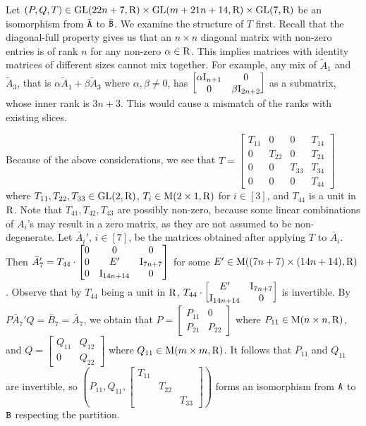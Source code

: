 \begin{example}
Let $(P, Q, T)\in \mathrm{GL}(22n+7, \mathrm{R})\times \mathrm{GL}(m+21n+14, \mathrm{R})\times\mathrm{GL}(7, \mathrm{R})$ be an isomorphism from $\bar{\mathtt{A}}$ to $\bar{\mathtt{B}}$. We examine the structure of $T$ first. Recall that the diagonal-full property gives us that an $n\times n$ diagonal matrix with non-zero entries is of rank $n$ for any non-zero $\alpha\in\mathrm{R}$. This implies matrices with identity matrices of different sizes cannot mix together. For example, any mix of $\tilde A_1$ and $\tilde A_3$, that is $\alpha\tilde A_1+\beta\tilde A_3$ where $\alpha, \beta\neq 0$, has $\begin{bmatrix}
	\alpha\mathrm{I}_{n+1} & 0 \\
	0 & \beta\mathrm{I}_{2n+2}
\end{bmatrix}$ as a submatrix, whose inner rank is $3n+3$. This would cause a mismatch of the ranks with existing slices.

Because of the above considerations, we see that $T=\begin{bmatrix}
	T_{11} & 0 & 0 & T_{14}\\
	0 & T_{22} & 0 & T_{24} \\
	0 & 0 & T_{33} & T_{34} \\
	0 & 0 & 0 & T_{44}
\end{bmatrix}$ where $T_{11}, T_{22}, T_{33}\in\mathrm{GL}(2, \mathrm{R})$, $T_{i}\in \mathrm{M}(2\times 1, \mathrm{R})$ for $i\in[3]$, and $T_{44}$ is a unit in $\mathrm{R}$. Note that $T_{41}, T_{42}, T_{43}$ are possibly non-zero, because some linear combinations of $A_i$'s may result in a zero matrix, as they are not assumed to be non-degenerate. Let $\bar A_i'$, $i\in[7]$, be the matrices obtained after applying $T$ to $\bar A_i$. Then $\bar A_7'=T_{44}\cdot \begin{bmatrix}
0 & 0 & 0 \\
0 & E' & \mathrm{I}_{7n+7} \\
0 & \mathrm{I}_{14n+14} & 0 
\end{bmatrix}$ for some $E'\in \mathrm{M}((7n+7)\times (14n+14), \mathrm{R})$. Observe that by $T_{44}$ being a unit in $\mathrm{R}$, $T_{44}\cdot \begin{bmatrix}
E' & \mathrm{I}_{7n+7} \\
\mathrm{I}_{14n+14} & 0 
\end{bmatrix}$ is invertible. By $P\bar A_7' Q=\bar B_7=\bar A_7$, we obtain that $P=\begin{bmatrix}
P_{11} & 0\\
P_{21} & P_{22}
\end{bmatrix}$ where $P_{11}\in\mathrm{M}(n\times n, \mathrm{R})$, and $Q=\begin{bmatrix}
Q_{11} & Q_{12} \\
0 & Q_{22}
\end{bmatrix}$ where $Q_{11}\in\mathrm{M}(m\times m, \mathrm{R})$. It follows that $P_{11}$ and $Q_{11}$ are invertible, so $(P_{11}, Q_{11}, \begin{bmatrix}
T_{11} & & \\
& T_{22} & \\
& & T_{33}
\end{bmatrix}
)$ forms an isomorphism from $\mathtt{A}$ to $\mathtt{B}$ respecting the partition.
\end{example}

